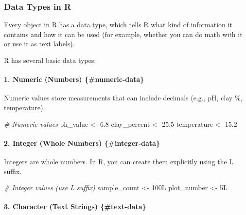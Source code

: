 \documentclass[
  10pt,
  b5paper,
  oneside]{book}
\newenvironment{Shaded}{\begin{snugshade}}{\end{snugshade}}
\newcommand{\CommentTok}[1]{\textcolor[rgb]{0.56,0.35,0.01}{\textit{#1}}}
\newcommand{\DataTypeTok}[1]{\textcolor[rgb]{0.13,0.29,0.53}{#1}}
\newcommand{\DecValTok}[1]{\textcolor[rgb]{0.00,0.00,0.81}{#1}}
\newcommand{\FloatTok}[1]{\textcolor[rgb]{0.00,0.00,0.81}{#1}}
\newcommand{\NormalTok}[1]{#1}
\newcommand{\OtherTok}[1]{\textcolor[rgb]{0.56,0.35,0.01}{#1}}
\begin{document}
\subsubsection{Data Types in R}\label{data-types}

Every object in R has a data type, which tells R what kind of information it contains and how it can be used (for example, whether you can do math with it or use it as text labels).

R has several basic data types:

\paragraph*{1. Numeric (Numbers) \{\#numeric-data\}}\label{numeric-numbers-numeric-data}

Numeric values store measurements that can include decimals (e.g., pH, clay \%, temperature).

\begin{Shaded}
\begin{Highlighting}[]
\CommentTok{\# Numeric values}
\NormalTok{ph\_value }\OtherTok{\textless{}{-}} \FloatTok{6.8}
\NormalTok{clay\_percent }\OtherTok{\textless{}{-}} \FloatTok{25.5}
\NormalTok{temperature }\OtherTok{\textless{}{-}} \FloatTok{15.2}
\end{Highlighting}
\end{Shaded}

\paragraph*{2. Integer (Whole Numbers) \{\#integer-data\}}\label{integer-whole-numbers-integer-data}

Integers are whole numbers. In R, you can create them explicitly using the L suffix.

\begin{Shaded}
\begin{Highlighting}[]
\CommentTok{\# Integer values (use L suffix)}
\NormalTok{sample\_count }\OtherTok{\textless{}{-}} \DecValTok{100}\DataTypeTok{L}
\NormalTok{plot\_number }\OtherTok{\textless{}{-}} \DecValTok{5}\DataTypeTok{L}
\end{Highlighting}
\end{Shaded}

\paragraph*{3. Character (Text Strings) \{\#text-data\}}\label{character-text-strings-text-data}
\end{document}
